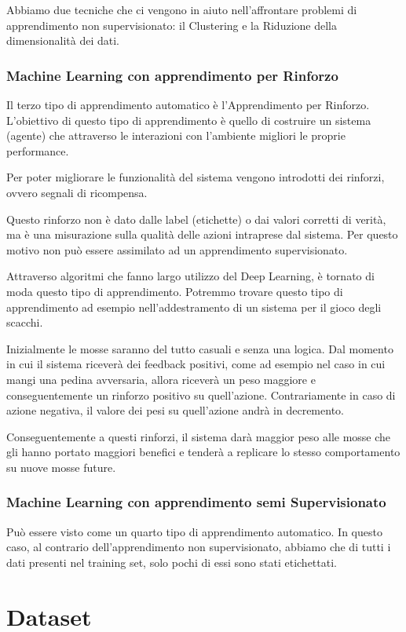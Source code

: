 \documentclass[12pt,italian]{report}
\begin{document}
Abbiamo due tecniche che ci vengono in aiuto nell’affrontare problemi di apprendimento non supervisionato: il Clustering e la Riduzione della dimensionalità dei dati.
\subsection{Machine Learning con apprendimento per Rinforzo}
Il terzo tipo di apprendimento automatico è l’Apprendimento per Rinforzo. L’obiettivo di questo tipo di apprendimento è quello di costruire un sistema (agente) che attraverso le interazioni con l’ambiente migliori le proprie performance.

Per poter migliorare le funzionalità del sistema vengono introdotti dei rinforzi, ovvero segnali di ricompensa.

Questo rinforzo non è dato dalle label (etichette) o dai valori corretti di verità, ma è una misurazione sulla qualità delle azioni intraprese dal sistema. Per questo motivo non può essere assimilato ad un apprendimento supervisionato.

Attraverso algoritmi che fanno largo utilizzo del Deep Learning, è tornato di moda questo tipo di apprendimento. Potremmo trovare questo tipo di apprendimento ad esempio nell’addestramento di un sistema per il gioco degli scacchi.

Inizialmente le mosse saranno del tutto casuali e senza una logica. Dal momento in cui il sistema riceverà dei feedback positivi, come ad esempio nel caso in cui mangi una pedina avversaria, allora riceverà un peso maggiore e conseguentemente un rinforzo positivo su quell’azione. Contrariamente in caso di azione negativa, il valore dei pesi su quell’azione andrà in decremento.

Conseguentemente a questi rinforzi, il sistema darà maggior peso alle mosse che gli hanno portato maggiori benefici e tenderà a replicare lo stesso comportamento su nuove mosse future.
\subsection{Machine Learning con apprendimento semi Supervisionato}
Può essere visto come un quarto tipo di apprendimento automatico. In questo caso, al contrario dell’apprendimento non supervisionato, abbiamo che di tutti i dati presenti nel training set, solo pochi di essi sono stati etichettati.
% 
% 

\chapter{Dataset}
\end{document}
